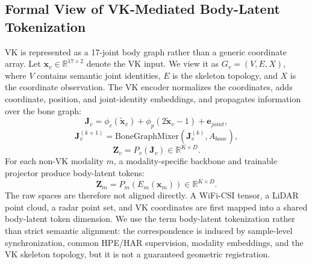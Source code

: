 ﻿\documentclass[journal]{IEEEtran}
\begin{document}
\subsection{Formal View of VK-Mediated Body-Latent Tokenization}
VK is represented as a 17-joint body graph rather than a generic coordinate array. Let $\mathbf{x}_{v}\in\mathbb{R}^{17\times 2}$ denote the VK input. We view it as $G_v=(V,E,X)$, where $V$ contains semantic joint identities, $E$ is the skeleton topology, and $X$ is the coordinate observation. The VK encoder normalizes the coordinates, adds coordinate, position, and joint-identity embeddings, and propagates information over the bone graph:
\begin{equation}
    \mathbf{J}_{v}=\phi_c(\tilde{\mathbf{x}}_v)+\phi_p(2\tilde{\mathbf{x}}_v-1)+\mathbf{e}_{joint},
\end{equation}
\begin{equation}
    \mathbf{J}_{v}^{(k+1)}=\mathrm{BoneGraphMixer}(\mathbf{J}_{v}^{(k)}, A_{bone}),
\end{equation}
\begin{equation}
    \mathbf{Z}_{v}=P_v(\mathbf{J}_v)\in\mathbb{R}^{K\times D}.
\end{equation}
For each non-VK modality $m$, a modality-specific backbone and trainable projector produce body-latent tokens:
\begin{equation}
    \mathbf{Z}_{m}=P_m(E_m(\mathbf{x}_m))\in\mathbb{R}^{K\times D}.
\end{equation}
The raw spaces are therefore not aligned directly. A WiFi-CSI tensor, a LiDAR point cloud, a radar point set, and VK coordinates are first mapped into a shared body-latent token dimension. We use the term body-latent tokenization rather than strict semantic alignment: the correspondence is induced by sample-level synchronization, common HPE/HAR supervision, modality embeddings, and the VK skeleton topology, but it is not a guaranteed geometric registration.
\end{document}
